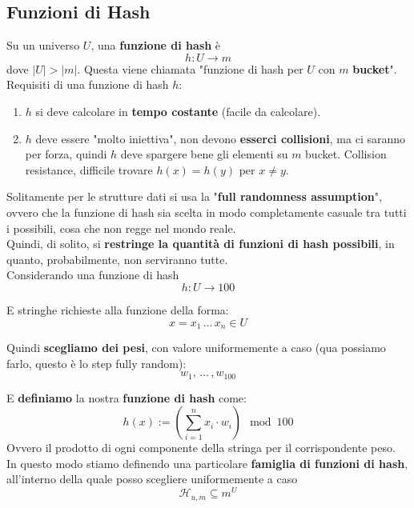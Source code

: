 
\newpage

\subsection{Funzioni di Hash}

Su un universo $U$, una \textbf{funzione di hash} è 
$$ h: U \rightarrow m $$
dove $|U| > |m|$. Questa viene chiamata "funzione di hash per $U$ con $m$ \textbf{bucket}".\\

Requisiti di una funzione di hash $h$: 
\begin{enumerate}
	\item $h$ si deve calcolare in \textbf{tempo costante} (facile da calcolare).\\
	
	\item $h$ deve essere "molto iniettiva", non devono \textbf{esserci collisioni}, ma ci saranno per forza, quindi $h$ deve spargere bene gli elementi su $m$ bucket. Collision resistance, difficile trovare $h(x) = h(y)$ per $x \neq y$.\\
\end{enumerate}

Solitamente per le strutture dati si usa la "\textbf{full randomness assumption}", ovvero che la funzione di hash sia scelta in modo completamente casuale tra tutti i possibili, cosa che non regge nel mondo reale.\\

Quindi, di solito, si \textbf{restringe la quantità di funzioni di hash possibili}, in quanto, probabilmente, non serviranno tutte.\\

Considerando una funzione di hash 
$$ h: U \rightarrow 100$$

E stringhe richieste alla funzione della forma: 
$$ x = x_1 \, \dots \, x_n \in U $$

Quindi \textbf{scegliamo dei pesi}, con valore uniformemente a caso (qua possiamo farlo, questo è lo step fully random):
$$ w_1, \, \dots \, , w_{100}$$

\newpage

E \textbf{definiamo} la nostra \textbf{funzione di hash} come:
$$ h(x) := \left(\sum_{i=1}^{n} x_i \cdot w_i \right) \mod 100 $$
Ovvero il prodotto di ogni componente della stringa per il corrispondente peso.\\

In questo modo stiamo definendo una particolare \textbf{famiglia di funzioni di hash}, all'interno della quale posso scegliere uniformemente a caso
$$ \mathcal{H}_{u,m} \subseteq m^U $$

